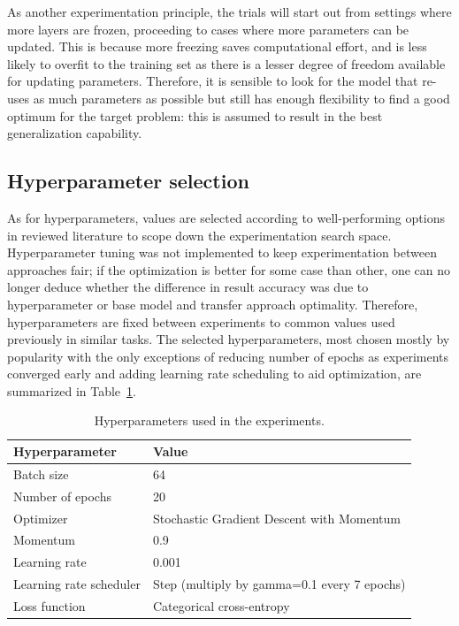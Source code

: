 \documentclass[english,twoside,openright]{UH_DS_MSc}
\begin{document}
As another experimentation principle, the trials will start out from settings where more layers are frozen, proceeding to
cases where more parameters can be updated. This is because more freezing saves 
computational effort, and is less likely to overfit to the training set as there is a lesser degree of freedom 
available for updating parameters. Therefore, it is sensible to look for the model that re-uses as 
much parameters as possible but still has enough flexibility to find a good optimum for the target problem:
this is assumed to result in the best generalization capability.

\subsection{Hyperparameter selection}

As for hyperparameters, values are selected according to well-performing 
options in reviewed literature to scope down the experimentation search space.
Hyperparameter tuning was not implemented to keep experimentation 
between approaches fair; if the optimization is better for some case than other, one can no 
longer deduce whether the difference in result accuracy was due to hyperparameter or base model and 
transfer approach optimality. Therefore, hyperparameters are fixed between experiments to common values 
used previously in similar tasks. The selected hyperparameters, most chosen mostly by popularity 
with the only exceptions of reducing number of epochs as experiments converged early
and adding learning rate scheduling to aid optimization,
are summarized in Table~\ref{table:hyperparameters}.

\begin{table}[h!]
    \centering
    \caption{Hyperparameters used in the experiments.}
    \begin{tabular}{ll}
    \hline
    \textbf{Hyperparameter} & \textbf{Value} \\ \hline
    Batch size & 64 \\ 
    Number of epochs & 20 \\
    Optimizer & Stochastic Gradient Descent with Momentum \\
    Momentum & 0.9 \\
    Learning rate & 0.001 \\
    Learning rate scheduler & Step (multiply by gamma=0.1 every 7 epochs)\\
    Loss function & Categorical cross-entropy \\ \hline
    \end{tabular}
    \label{table:hyperparameters}
\end{table}
\end{document}
